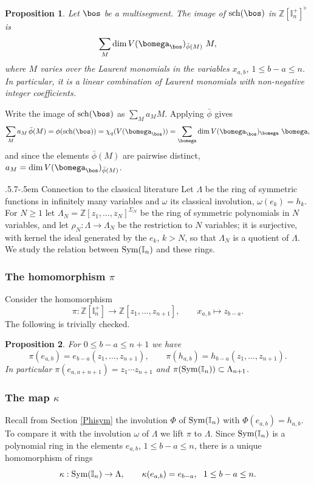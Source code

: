 \documentclass[11pt,reqno]{amsart}
\makeatletter
\newtheorem*{prop}{Proposition}
\theoremstyle{definition} \newtheorem*{defn}{Definition}
\theoremstyle{definition}
\newenvironment{pf}{\proof}{\endproof}
\numberwithin{equation}{section}
\def\subsection{\def\@secnumfont{\bfseries}\@startsection{subsection}{2}%
  {\parindent}{.5\linespacing\@plus.7\linespacing}{-.5em}%
  {\normalfont\bfseries}}
\makeatother
\begin{document}
\begin{prop}\label{positive} Let $\bos$ be a multisegment. The image of ${\rm sch}(\bos)$ in
$\mathbb Z[\mathbb I_n^+]^\flat$ is
$$\sum_M\dim V(\bomega_\bos)_{\bar\phi(M)}\ M,$$
where $M$ varies over the Laurent monomials in the variables $x_{a,b}$, $1\le b-a\le n$. In
particular, it is a linear combination of Laurent monomials with non-negative integer
coefficients.
\end{prop}
\begin{pf} Write the image of ${\rm sch}(\bos)$ as $\sum_Ma_MM$. Applying $\bar\phi$ gives
$$\sum_Ma_M\,\bar\phi(M)=\phi({\rm sch}(\bos))=\chi_q(V(\bomega_\bos))
=\sum_{\bomega}\dim V(\bomega_\bos)_{\bomega}\ \bomega,$$
and since the elements $\bar\phi(M)$ are pairwise distinct, $a_M=\dim V(\bomega_\bos)_{\bar\phi(M)}$.
\end{pf}




\subsection{Connection to the classical literature}\label{classical} Let $\Lambda$ be the ring of symmetric functions
in infinitely many variables and $\omega$ its classical involution, $\omega(e_k)=h_k$. For $N\ge1$ let
$\Lambda_N=\mathbb Z[z_1,\dots,z_N]^{\Sigma_N}$ be the ring of symmetric polynomials in $N$ variables, and let $\rho_N:\Lambda\to\Lambda_N$ be
the restriction to $N$ variables; it is surjective, with kernel the ideal generated by the $e_k$, $k>N$, so that $\Lambda_N$ is a
quotient of $\Lambda$.
We study 
the relation between ${\rm Sym}(\mathbb I_n)$ and these rings.
\subsubsection{The homomorphism $\pi$} Consider the homomorphism
$$\pi:\mathbb Z[\mathbb I_n^+]\to\mathbb Z[z_1,\dots,z_{n+1}],\qquad x_{a,b}\mapsto z_{b-a}.$$ The following is trivially checked.
\begin{prop} For $0\le b-a\le n+1$ we have
$$\pi(e_{a,b})=e_{b-a}(z_1,\dots,z_{n+1}),\qquad \pi(h_{a,b})=h_{b-a}(z_1,\dots,z_{n+1}).$$
In particular $\pi(e_{a,a+n+1})=z_1\cdots z_{n+1}$ and $\pi({\rm Sym}(\mathbb I_n))\subset\Lambda_{n+1}$. \hfill\qedsymbol
\end{prop}
\subsubsection{The map $\kappa$} Recall from Section \ref{Phisym}  the involution $\Phi$ of ${\rm Sym}(\mathbb I_n)$ with $\Phi(e_{a,b})=h_{a,b}$. To compare it
with the involution $\omega$ of $\Lambda$ we lift $\pi$ to $\Lambda$. Since ${\rm Sym}(\mathbb I_n)$ is a polynomial ring in the elements
$e_{a,b}$, $1\le b-a\le n$, there is a unique homomorphism of rings
$$\kappa:{\rm Sym}(\mathbb I_n)\to\Lambda,\qquad \kappa(e_{a,b})=e_{b-a},\ \ 1\le b-a\le n.$$
\end{document}
